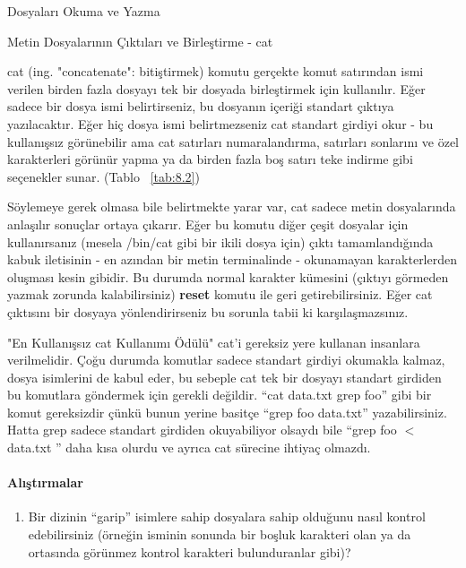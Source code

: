 \begin{section}{Dosyaları Okuma ve Yazma}
\begin{subsection}{Metin Dosyalarının Çıktıları ve Birleştirme - cat}

cat (ing. "concatenate": bitiştirmek) komutu gerçekte komut satırından ismi verilen birden fazla dosyayı tek bir dosyada birleştirmek için kullanılır. Eğer sadece bir dosya ismi belirtirseniz, bu dosyanın içeriği standart çıktıya yazılacaktır. Eğer hiç dosya ismi belirtmezseniz cat standart girdiyi okur - bu kullanışsız görünebilir ama cat satırları numaralandırma, satırları sonlarını ve özel karakterleri görünür yapma ya da birden fazla boş satırı teke indirme gibi seçenekler sunar. (Tablo ~\ref{tab:8.2})

Söylemeye gerek olmasa bile belirtmekte yarar var, cat sadece metin dos\-ya\-la\-rın\-da anlaşılır sonuçlar ortaya çıkarır. Eğer bu komutu diğer çeşit dosyalar için kullanırsanız (mesela /bin/cat gibi bir ikili dosya için) çıktı tamamlandığında kabuk iletisinin - en azından bir metin terminalinde - okunamayan karakterlerden oluşması kesin gibidir. Bu durumda normal karakter kümesini (çıktıyı görmeden yazmak zorunda kalabilirsiniz) \textbf{reset} komutu ile geri getirebilirsiniz. Eğer cat çıktısını bir dosyaya yönlendirirseniz bu sorunla tabii ki karşılaşmazsınız.

"En Kullanışsız cat Kullanımı Ödülü" cat'i gereksiz yere kullanan insanlara verilmelidir. Çoğu durumda komutlar sadece standart girdiyi okumakla kalmaz, dosya isimlerini de kabul eder, bu sebeple cat tek bir dosyayı standart girdiden bu komutlara göndermek için gerekli değildir. “cat data.txt \textbar grep foo” gibi bir komut gereksizdir çünkü bunun yerine basitçe “grep foo data.txt” yazabilirsiniz. Hatta grep sadece standart girdiden okuyabiliyor olsaydı bile “grep foo $<$data.txt ” daha kısa olurdu ve ayrıca cat sürecine ihtiyaç olmazdı.

\paragraph{{\Huge{\PencilLeftDown}}Alıştırmalar}{
\begin{enumerate}
 \item Bir dizinin “garip” isimlere sahip dosyalara sahip olduğunu nasıl kontrol edebilirsiniz (örneğin isminin sonunda bir boşluk karakteri olan ya da ortasında görünmez kontrol karakteri bulunduranlar gibi)?
\end{enumerate}}
\end{subsection}


\end{section}
